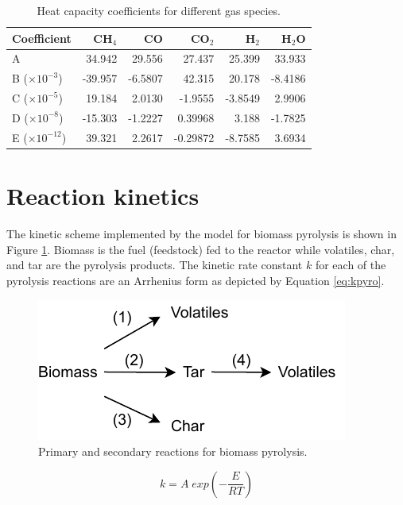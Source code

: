 \documentclass[12pt,titlepage]{article}
\begin{document}
\begin{table}[ht]
    \caption{Heat capacity coefficients for different gas species.}
    \label{tab:heatcap-coeffs}
    \centering
    \begin{tabular}{lrrrrr}
        \toprule
        Coefficient & CH$_4$ & CO & CO$_2$ & H$_2$ & H$_2$O \\
        \midrule
        A                   & 34.942 & 29.556 & 27.437 & 25.399 & 33.933 \\
        B ($\times10^{-3}$) & -39.957 & -6.5807 & 42.315 & 20.178 & -8.4186 \\
        C ($\times10^{-5}$) & 19.184 & 2.0130 & -1.9555 & -3.8549 & 2.9906 \\
        D ($\times10^{-8}$) & -15.303 & -1.2227 & 0.39968 & 3.188 & -1.7825 \\
        E ($\times10^{-12}$) & 39.321 & 2.2617 & -0.29872 & -8.7585 & 3.6934 \\
        \bottomrule
    \end{tabular}
\end{table}

\section{Reaction kinetics}

The kinetic scheme implemented by the model for biomass pyrolysis is shown in Figure \ref{fig:pyrolysis}. Biomass is the fuel (feedstock) fed to the reactor while volatiles, char, and tar are the pyrolysis products. The kinetic rate constant $k$ for each of the pyrolysis reactions are an Arrhenius form as depicted by Equation \ref{eq:kpyro}.

\begin{figure}[ht]
    \centering
    \includegraphics{figures/pyrolysis.pdf}
    \caption{Primary and secondary reactions for biomass pyrolysis.}
    \label{fig:pyrolysis}
\end{figure}

\begin{equation}
    k = A\; exp \left( -\frac{E}{R T} \right) \label{eq:kpyro}
\end{equation}
\end{document}

